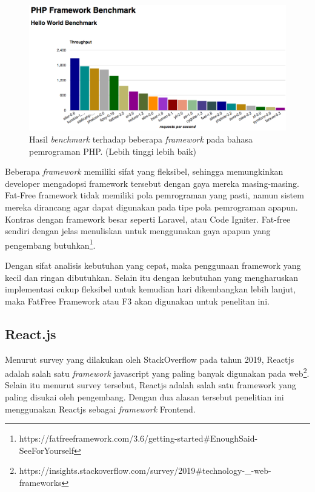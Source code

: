 \begin{figure}[H]
    \centering
    \includegraphics[width=0.6\paperwidth]{Gambar/php-framework-benchmark-20170214.png}
    \caption{Hasil \textit{benchmark} terhadap beberapa \textit{framework} pada
        bahasa pemrograman PHP\protect\cite{kenjis:framework-benchmark}. (Lebih
        tinggi lebih baik)}
    \label{fig:chart-benchmark-php-framework}
\end{figure}

Beberapa \textit{framework} memiliki sifat yang fleksibel, sehingga memungkinkan
developer mengadopsi framework tersebut dengan gaya mereka masing-masing.
Fat-Free framework tidak memiliki pola pemrograman yang pasti, namun sistem
mereka dirancang agar dapat digunakan pada tipe pola pemrograman apapun. Kontras
dengan framework besar seperti Laravel, atau Code Igniter. Fat-free sendiri
dengan jelas menuliskan untuk menggunakan gaya apapun yang pengembang
butuhkan\footnote{https://fatfreeframework.com/3.6/getting-started\#EnoughSaid-SeeForYourself}.
 
Dengan sifat analisis kebutuhan yang cepat, maka penggunaan framework yang kecil
dan ringan dibutuhkan. Selain itu dengan kebutuhan yang mengharuskan
implementasi cukup fleksibel untuk kemudian hari dikembangkan lebih lanjut, maka
FatFree Framework atau F3 akan digunakan untuk penelitan ini.

\subsection{React.js}
    Menurut survey yang dilakukan oleh StackOverflow pada tahun 2019, Reactjs
    adalah salah satu \textit{framework} javascript yang paling banyak digunakan
    pada
    web\footnote{https://insights.stackoverflow.com/survey/2019{\#}technology-{\_}-web-frameworks}.
    Selain itu menurut survey tersebut, Reactjs adalah salah satu framework yang
    paling disukai oleh pengembang. Dengan dua alasan tersebut penelitian ini
    menggunakan Reactjs sebagai \textit{framework} Frontend.

